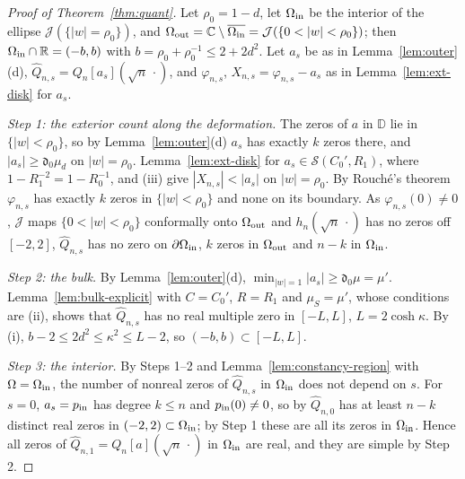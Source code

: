 \documentclass[11pt]{amsart}
\theoremstyle{definition}
\theoremstyle{remark}
\numberwithin{equation}{section}
\newcommand{\C}{\mathbb{C}}
\newcommand{\R}{\mathbb{R}}
\newcommand{\D}{\mathbb{D}}
\begin{document}
\begin{proof}[Proof of Theorem~\ref{thm:quant}]
Let $\rho_0=1-d$, let $\Omega_{\rm in}$ be the interior of the ellipse $\mathcal J(\{|w|=\rho_0\})$, and $\Omega_{\rm out}=\C\setminus\overline{\Omega_{\rm in}}=\mathcal J(\{0<|w|<\rho_0\})$; then $\Omega_{\rm in}\cap\R=(-b,b)$ with $b=\rho_0+\rho_0^{-1}\le2+2d^2$. Let $a_s$ be as in Lemma~\ref{lem:outer}(d), $\widehat Q_{n,s}=Q_n[a_s](\sqrt n\,\cdot)$, and $\varphi_{n,s}$, $X_{n,s}=\varphi_{n,s}-a_s$ as in Lemma~\ref{lem:ext-disk} for $a_s$.

\emph{Step 1: the exterior count along the deformation.} The zeros of $a$ in $\D$ lie in $\{|w|<\rho_0\}$, so by Lemma~\ref{lem:outer}(d) $a_s$ has exactly $k$ zeros there, and $|a_s|\ge\mathfrak d_0\mu_d$ on $|w|=\rho_0$. Lemma~\ref{lem:ext-disk} for $a_s\in\mathcal S(C_0',R_1)$, where $1-R_1^{-2}=1-R_0^{-1}$, and (iii) give $|X_{n,s}|<|a_s|$ on $|w|=\rho_0$. By Rouch\'e's theorem $\varphi_{n,s}$ has exactly $k$ zeros in $\{|w|<\rho_0\}$ and none on its boundary. As $\varphi_{n,s}(0)\ne0$, $\mathcal J$ maps $\{0<|w|<\rho_0\}$ conformally onto $\Omega_{\rm out}$ and $h_n(\sqrt n\,\cdot)$ has no zeros off $[-2,2]$, $\widehat Q_{n,s}$ has no zero on $\partial\Omega_{\rm in}$, $k$ zeros in $\Omega_{\rm out}$ and $n-k$ in $\Omega_{\rm in}$.

\emph{Step 2: the bulk.} By Lemma~\ref{lem:outer}(d), $\min_{|w|=1}|a_s|\ge\mathfrak d_0\mu=\mu'$. Lemma~\ref{lem:bulk-explicit} with $C=C_0'$, $R=R_1$ and $\mu_S=\mu'$, whose conditions are (ii), shows that $\widehat Q_{n,s}$ has no real multiple zero in $[-L,L]$, $L=2\cosh\kappa$. By (i), $b-2\le2d^2\le\kappa^2\le L-2$, so $(-b,b)\subset[-L,L]$.

\emph{Step 3: the interior.} By Steps 1--2 and Lemma~\ref{lem:constancy-region} with $\Omega=\Omega_{\rm in}$, the number of nonreal zeros of $\widehat Q_{n,s}$ in $\Omega_{\rm in}$ does not depend on $s$. For $s=0$, $a_s=p_{\rm in}$ has degree $k\le n$ and $p_{\rm in}(0)\ne0$, so by \cite[Lemma~\ref{M-lem:quasi}]{Main} $\widehat Q_{n,0}$ has at least $n-k$ distinct real zeros in $(-2,2)\subset\Omega_{\rm in}$; by Step 1 these are all its zeros in $\Omega_{\rm in}$. Hence all zeros of $\widehat Q_{n,1}=Q_n[a](\sqrt n\,\cdot)$ in $\Omega_{\rm in}$ are real, and they are simple by Step 2.


\end{proof}
\end{document}
